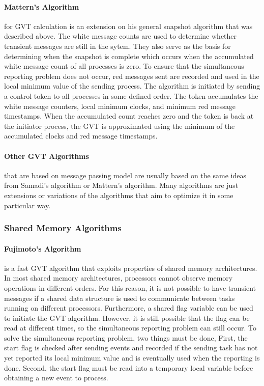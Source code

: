 \documentclass[11pt]{book}
\begin{document}
\paragraph{Mattern's Algorithm}\cite{mattern-93} for GVT calculation is an extension on his
general snapshot algorithm that was described above. The white message counts are used to
determine whether transient messages are still in the sytem. They also serve as the basis
for determining when the snapshot is complete which occurs when the accumulated white message
count of all processes is zero. To ensure that the simultaneous reporting problem does not
occur, red messages sent are recorded and used in the local minimum value of the sending process.
The algorithm is initiated by sending a control token to all processes in some defined order.
The token accumulates the white message counters, local minimum clocks, and minimum red message
timestamps. When the accumulated count reaches zero and the token is back at the initiator process,
the GVT is approximated using the minimum of the accumulated clocks and red message timestamps.

\paragraph{Other GVT Algorithms} that are based on message passing model are usually based
on the same ideas from Samadi's algorithm or Mattern's algorithm. Many algorithms are just
extensions or variations of the algorithms that aim to optimize it in some particular way.

\subsubsection{Shared Memory Algorithms}

\paragraph{Fujimoto's Algorithm}\cite{fujimoto-94} is a fast GVT algorithm that exploits
properties of shared memory architectures. In most shared memory architectures, processors
cannot observe memory operations in different orders. For this reason, it is not possible
to have transient messages if a shared data structure is used to communicate between tasks
running on different processors. Furthermore, a shared flag variable can be used to initiate
the GVT algorithm. However, it is still possible that the flag can be read at different
times, so the simultaneous reporting problem can still occur. To solve the simultaneous
reporting problem, two things must be done, First, the start flag is checked after sending
events and recorded if the sending task has not yet reported its local minimum value and
is eventually used when the reporting is done. Second, the start flag must be read into a
temporary local variable before obtaining a new event to process.
\end{document}
